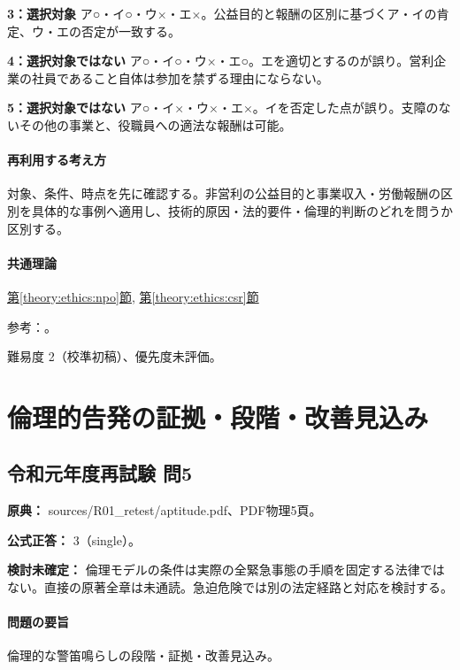 \noindent\textbf{3：選択対象} ア○・イ○・ウ×・エ×。公益目的と報酬の区別に基づくア・イの肯定、ウ・エの否定が一致する。\par

\noindent\textbf{4：選択対象ではない} ア○・イ○・ウ×・エ○。エを適切とするのが誤り。営利企業の社員であること自体は参加を禁ずる理由にならない。\par

\noindent\textbf{5：選択対象ではない} ア○・イ×・ウ×・エ×。イを否定した点が誤り。支障のないその他の事業と、役職員への適法な報酬は可能。\par

\paragraph{再利用する考え方} 対象、条件、時点を先に確認する。非営利の公益目的と事業収入・労働報酬の区別を具体的な事例へ適用し、技術的原因・法的要件・倫理的判断のどれを問うか区別する。

\paragraph{共通理論} \hyperref[theory:ethics:npo]{第\ref*{theory:ethics:npo}節}, \hyperref[theory:ethics:csr]{第\ref*{theory:ethics:csr}節}

\par 参考：\cite{cabinet_npo_overview,cabinet_npo_officers}。

\par 難易度 2（校準初稿）、優先度未評価。

\section{倫理的告発の証拠・段階・改善見込み}

\subsection{令和元年度再試験 問5}
\label{q:r01-ret-apt-05}

\noindent\textbf{原典：} sources/R01\_retest/aptitude.pdf、PDF物理5頁。

\textbf{公式正答：} 3（single）。

\par\textbf{検討未確定：} 倫理モデルの条件は実際の全緊急事態の手順を固定する法律ではない。直接の原著全章は未通読。急迫危険では別の法定経路と対応を検討する。

\paragraph{問題の要旨} 倫理的な警笛鳴らしの段階・証拠・改善見込み。

